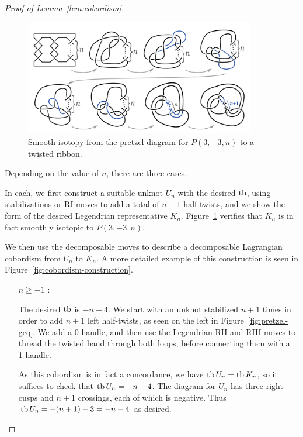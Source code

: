 \begin{proof}[Proof of Lemma~\ref{lem:cobordism}]

    \begin{figure}[ht]
        \centering
        \includegraphics[width=0.9\textwidth]{images/isotopy-presentable.pdf}
        \caption{Smooth isotopy from the pretzel diagram for $P(3, -3, n)$ to a twisted ribbon.}
        \label{fig:isotopy}
    \end{figure}

    Depending on the value of $n$, there are three cases.

    In each, we first construct a suitable unknot $U_n$ with the desired $\operatorname{tb}$, using stabilizations or RI moves to add a total of $n-1$ half-twists, and we show the form of the desired Legendrian representative $K_n$. Figure~\ref{fig:isotopy} verifies that $K_n$ is in fact smoothly isotopic to $P(3, -3, n)$.

    We then use the decomposable moves to describe a decomposable Lagrangian cobordism from $U_n$ to $K_n$. A more detailed example of this construction is seen in Figure~\ref{fig:cobordism-construction}.

\begin{itemize}

    \item[$n \geq -1$ :]

        The desired $\operatorname{tb}$ is $-n-4$.
        We start with an unknot stabilized $n+1$ times in order to add $n+1$ left half-twists, as seen on the left in Figure~\ref{fig:pretzel-geq}.
        We add a 0-handle, and then use the Legendrian RII and RIII moves to thread the twisted band through both loops, before connecting them with a 1-handle.

        As this cobordism is in fact a concordance, we have $\operatorname{tb} U_n = \operatorname{tb} K_n$, so it suffices to check that $\operatorname{tb} U_n = -n-4$. The diagram for $U_n$ has three right cusps and $n+1$ crossings, each of which is negative. Thus $\operatorname{tb} U_n = -(n+1) - 3 = -n-4$ as desired.


\end{itemize}
\end{proof}
